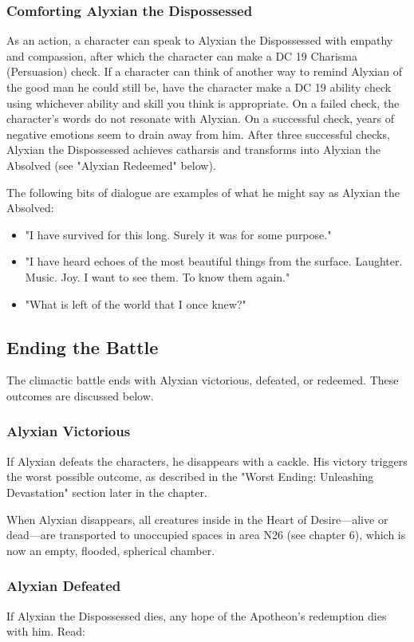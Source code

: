 \documentclass[10pt,a4paper,twoside,bg=print,twocolumn,openany,nodeprecatedcode]{dndbook}
\begin{document}
\subsubsection{Comforting Alyxian the Dispossessed}
As an action, a character can speak to Alyxian the Dispossessed with empathy and compassion, after which the character can make a DC 19 Charisma (Persuasion) check. If a character can think of another way to remind Alyxian of the good man he could still be, have the character make a DC 19 ability check using whichever ability and skill you think is appropriate. On a failed check, the character's words do not resonate with Alyxian. On a successful check, years of negative emotions seem to drain away from him. After three successful checks, Alyxian the Dispossessed achieves catharsis and transforms into Alyxian the Absolved (see "Alyxian Redeemed" below).

The following bits of dialogue are examples of what he might say as Alyxian the Absolved:


\begin{itemize}
\item "I have survived for this long. Surely it was for some purpose."
\item "I have heard echoes of the most beautiful things from the surface. Laughter. Music. Joy. I want to see them. To know them again."
\item "What is left of the world that I once knew?"
\end{itemize}

\subsection{Ending the Battle}
The climactic battle ends with Alyxian victorious, defeated, or redeemed. These outcomes are discussed below.

\subsubsection{Alyxian Victorious}
If Alyxian defeats the characters, he disappears with a cackle. His victory triggers the worst possible outcome, as described in the "Worst Ending: Unleashing Devastation" section later in the chapter.

When Alyxian disappears, all creatures inside in the Heart of Desire—alive or dead—are transported to unoccupied spaces in area N26 (see chapter 6), which is now an empty, flooded, spherical chamber.

\subsubsection{Alyxian Defeated}
If Alyxian the Dispossessed dies, any hope of the Apotheon's redemption dies with him. Read:
\end{document}
